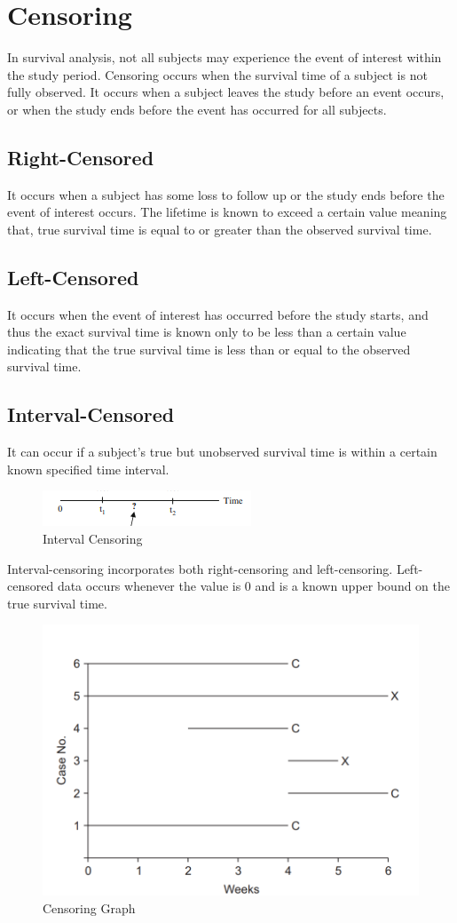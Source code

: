 \documentclass[doublespacing]{report} %
\begin{document}
\section{Censoring}

In survival analysis, not all subjects may experience the event of interest within the study period. Censoring occurs when the survival time of a subject is not fully observed. It occurs when a subject leaves the study before an event occurs, or when the study ends before the event has occurred for all subjects.


\subsection{Right-Censored}

It occurs when a subject has some loss to follow up or the study ends before the event of interest occurs. The lifetime is known to exceed a certain value meaning that, true survival time is equal to or greater than the observed survival time.

\subsection{Left-Censored}

It occurs when the event of interest has occurred before the study starts, and thus the exact survival time is known only to be less than a certain value indicating that the true survival time is less than or equal to the observed survival time.

\subsection{Interval-Censored}
It can occur if a subject’s true but unobserved survival time is within a certain known specified time interval. 
\begin{figure}[H]
    \centering
    \includegraphics[width=0.4\linewidth]{Figure 3/3.1.png}
    \caption{Interval Censoring}
    \label{Figure 3.1}
\end{figure}

Interval-censoring incorporates both right-censoring and left-censoring. Left-censored data occurs whenever the value is 0 and  is a known upper bound on the true survival time. 

\begin{figure}[H]
    \centering
    \includegraphics[width=0.5\linewidth]{Figure 3/3.2.png}
    \caption{Censoring Graph}
    \label{Figure 3.2}
\end{figure}
\end{document}
